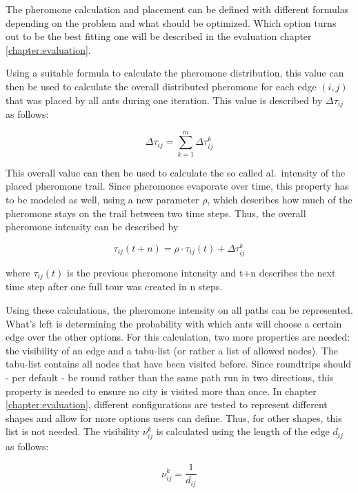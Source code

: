 The pheromone calculation and placement can be defined with different formulas depending on the problem and what should be optimized. 
Which option turns out to be the best fitting one will be described in the evaluation chapter \ref{chapter:evaluation}.


Using a suitable formula to calculate the pheromone distribution, this value can then be used to calculate the overall distributed pheromone for each edge $(i,j)$ that was placed by all ants during one iteration.
This value is described by $\Delta\tau_{ij}$ as follows\cite{dorigo_ant_1996}:

\begin{equation}\label{eq:deltaTau}
	\Delta\tau_{ij} = \sum_{k=1}^{m} \Delta\tau_{ij}^k 
\end{equation}

This overall value can then be used to calculate the so called al.\ intensity\grqq{} of the placed pheromone trail.
Since pheromones evaporate over time, this property has to be modeled as well, using a new parameter $\rho$, which describes how much of the pheromone stays on the trail between two time steps.
Thus, the overall pheromone intensity can be described by


\begin{equation}\label{eq:trailIntensity}
	\tau_{ij}(t+n) = \rho \cdot \tau_{ij}(t)+\Delta\tau_{ij}^k 
\end{equation}

where $\tau_{ij}(t)$ is the previous pheromone intensity and t+n describes the next time step after one full tour was created in n steps\cite{dorigo_ant_1996}.

Using these calculations, the pheromone intensity on all paths can be represented. 
What's left is determining the probability with which ants will choose a certain edge over the other options.
For this calculation, two more properties are needed: the visibility of an edge and a tabu-list (or rather a list of allowed nodes).
The tabu-list contains all nodes that have been visited before.
Since roundtrips should - per default - be round rather than the same path run in two directions, this property is needed to ensure no city is visited more than once.
In chapter \ref{chapter:evaluation}, different configurations are tested to represent different shapes and allow for more options users can define. 
Thus, for other shapes, this list is not needed.
The visibility $\nu_{ij}^k$ is calculated using the length of the edge $d_{ij}$ as follows:

\begin{equation}\label{eq:visibility}
	\nu_{ij}^k = \frac{1}{d_{ij}}
\end{equation}

